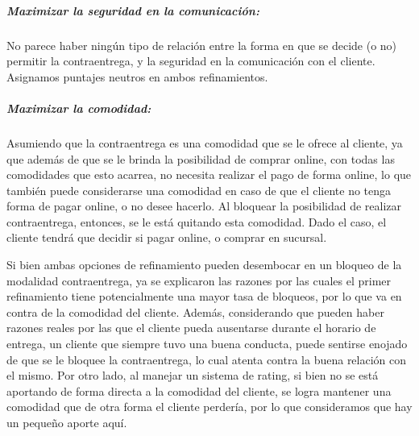 \subparagraph{Maximizar la seguridad en la comunicación:}

No parece haber ningún tipo de relación entre la forma en que se decide (o no)
permitir la contraentrega, y la seguridad en la comunicación con el cliente.
Asignamos puntajes neutros en ambos refinamientos.

\subparagraph{Maximizar la comodidad:}

Asumiendo que la contraentrega es una comodidad que se le ofrece al cliente,
ya que además de que se le brinda la posibilidad de comprar online, con todas
las comodidades que esto acarrea, no necesita realizar el pago de forma
online, lo que también puede considerarse una comodidad en caso de que el
cliente no tenga forma de pagar online, o no desee hacerlo. Al bloquear la
posibilidad de realizar contraentrega, entonces, se le está quitando esta
comodidad. Dado el caso, el cliente tendrá que decidir si pagar online, o
comprar en sucursal.

Si bien ambas opciones de refinamiento pueden desembocar en un bloqueo de la
modalidad contraentrega, ya se explicaron las razones por las cuales el primer
refinamiento tiene potencialmente una mayor tasa de bloqueos, por lo que va en
contra de la comodidad del cliente. Además, considerando que pueden haber
razones reales por las que el cliente pueda ausentarse durante el horario de
entrega, un cliente que siempre tuvo una buena conducta, puede sentirse
enojado de que se le bloquee la contraentrega, lo cual atenta contra la buena
relación con el mismo. Por otro lado, al manejar un sistema de rating, si bien
no se está aportando de forma directa a la comodidad del cliente, se logra
mantener una comodidad que de otra forma el cliente perdería, por lo que
consideramos que hay un pequeño aporte aquí.
